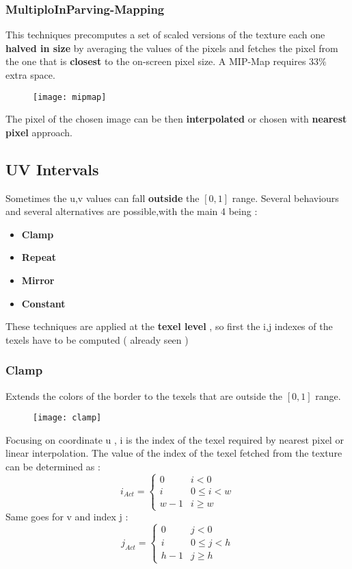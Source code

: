 \subsubsection{MultiploInParving-Mapping}
This techniques precomputes a set of scaled versions of the texture each one \textbf{halved in size} by averaging the values of the pixels and fetches the pixel from the one that is \textbf{closest} to the on-screen pixel size. A MIP-Map requires \textbf{$33\%$} extra space.

\begin{figure}[H]
 \centering
\texttt{[image: mipmap]} 
\end{figure}
The pixel of the chosen image can be then \textbf{interpolated} or chosen with \textbf{nearest pixel} approach.

\subsection{UV Intervals}
Sometimes the u,v values can fall \textbf{outside} the $[0,1]$ range. Several behaviours and several alternatives are possible,with the main 4 being :
\begin{itemize}
\item \textbf{Clamp}
\item \textbf{Repeat}
\item \textbf{Mirror}
\item \textbf{Constant}
\end{itemize}
These techniques are applied at the \textbf{texel level} , so first the i,j indexes of the texels have to be computed ( already seen ) 

\subsubsection{Clamp}
Extends the colors of the border to the texels that are outside the $[0,1]$ range.
\begin{figure}[H]
 \centering
\texttt{[image: clamp]} 
\end{figure}
Focusing on coordinate u , i is the index of the texel required by nearest pixel or linear interpolation. The value of the index of the texel fetched  from the texture can be determined as : 
\[ i_{Act} =
\begin{cases}
	0 & i < 0\\
	i & 0 \leq i < w \\
	w-1 & i \geq w
\end{cases}
\]
Same goes for v and index j :
\[ j_{Act} =
\begin{cases}
	0 & j < 0\\
	i & 0 \leq j < h \\
	h-1 & j \geq h
\end{cases}
\]

